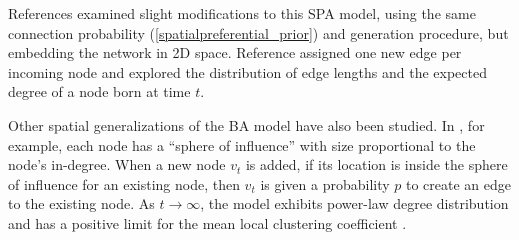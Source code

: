 \documentclass[%
 reprint,
 amsmath,amssymb,
 aps,
]{revtex4-1}
\begin{document}
{\color{red}References \cite{SPA2, SPA3} examined slight modifications to this SPA model, using the same connection probability (\ref{spatialpreferential_prior}) and generation procedure, but embedding the network in 2D space. }
Reference \cite{SPA2} assigned one new edge per incoming node and explored the distribution of edge lengths and the expected degree of a node born at time $t$.



Other spatial generalizations of the BA model have also been studied. In \cite{aiello, emmanuel}, for example, each node has a ``sphere of influence'' with size proportional to the node's in-degree. {\color{red}When a new node $v_t$ is added, if its location is inside the sphere of influence for an existing node, then $v_t$ is given a probability $p$ to create an edge to the existing node. As $t \rightarrow \infty$, the model exhibits power-law degree distribution and has a positive limit for the mean local clustering coefficient \cite{emmanuel}. }
\end{document}
